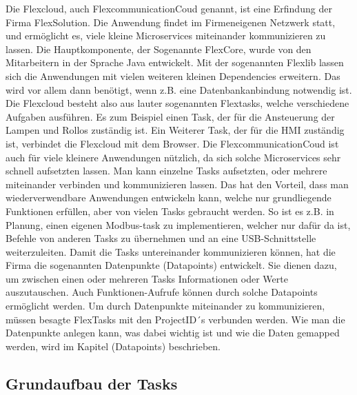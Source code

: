 Die Flexcloud, auch FlexcommunicationCoud genannt, ist eine Erfindung der Firma FlexSolution. Die Anwendung findet im Firmeneigenen Netzwerk statt, und ermöglicht es, viele kleine Microservices miteinander kommunizieren zu lassen. Die Hauptkomponente, der Sogenannte FlexCore, wurde von den Mitarbeitern in der Sprache Java entwickelt. Mit der sogenannten Flexlib lassen sich die Anwendungen mit vielen weiteren kleinen Dependencies erweitern. Das wird vor allem dann benötigt, wenn z.B. eine Datenbankanbindung notwendig ist. Die Flexcloud besteht also aus lauter sogenannten Flextasks, welche verschiedene Aufgaben ausführen. Es zum Beispiel einen Task, der für die Ansteuerung der Lampen und Rollos zuständig ist. Ein Weiterer Task, der für die HMI zuständig ist, verbindet die Flexcloud mit dem Browser. Die FlexcommunicationCoud ist auch für viele kleinere Anwendungen nützlich, da sich solche Microservices sehr schnell aufsetzten lassen. Man kann einzelne Tasks aufsetzten, oder mehrere miteinander verbinden und kommunizieren lassen. Das hat den Vorteil, dass man wiederverwendbare Anwendungen entwickeln kann, welche nur grundliegende Funktionen erfüllen, aber von vielen Tasks gebraucht werden. So ist es z.B. in Planung, einen eigenen Modbus-task zu implementieren, welcher nur dafür da ist, Befehle von anderen Tasks zu übernehmen und an eine USB-Schnittstelle weiterzuleiten. Damit die Tasks untereinander kommunizieren können, hat die Firma die sogenannten Datenpunkte (Datapoints) entwickelt. Sie dienen dazu, um zwischen einen oder mehreren Tasks Informationen oder Werte auszutauschen. Auch Funktionen-Aufrufe können durch solche Datapoints ermöglicht werden. Um durch Datenpunkte miteinander zu kommunizieren, müssen besagte FlexTasks mit den ProjectID´s verbunden werden. Wie man die Datenpunkte anlegen kann, was dabei wichtig ist und wie die Daten gemapped werden, wird im Kapitel (Datapoints) beschrieben. 

\subsection{Grundaufbau der Tasks}

